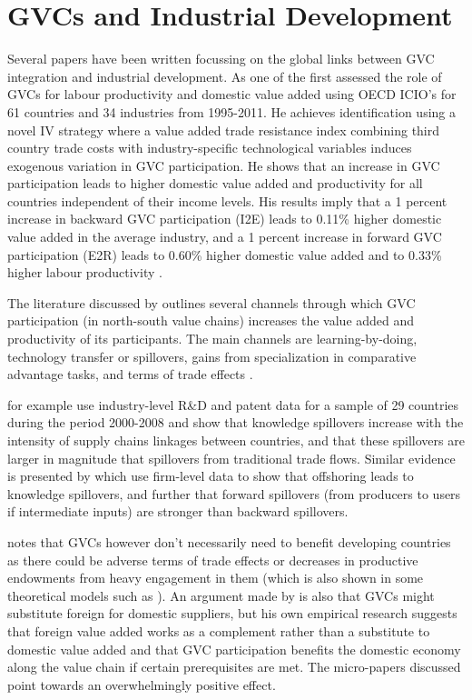 \documentclass[a4paper]{article}
\begin{document}
\section{GVCs and Industrial Development}
Several papers have been written focussing on the global links between GVC integration and industrial development. As one of the first \citet{Kummritz20161} assessed the role of GVCs for labour productivity and domestic value added using OECD ICIO's for 61 countries and 34 industries from 1995-2011. He achieves identification using a novel IV strategy where a value added trade resistance index combining third country trade costs with industry-specific technological variables induces exogenous variation in GVC participation. He shows that an increase in GVC participation leads to higher domestic value added and productivity for all countries independent of their income levels. His results imply that a 1 percent increase in backward GVC participation (I2E) leads to 0.11\% higher domestic value added in the average industry, and  a 1 percent increase in forward GVC participation (E2R) leads to 0.60\% higher domestic value added and to 0.33\% higher labour productivity \citep{Kummritz20161}. \newline


The literature discussed by \citet{Kummritz20161} outlines several channels through which GVC participation (in north-south value chains) increases the value added and productivity of its participants. The main channels are learning-by-doing, technology transfer or spillovers, gains from specialization in comparative advantage tasks, and terms of trade effects  \citep{Kummritz20161}. \newline

\citet{piermartini2014knowledge} for example use industry-level R\&D and patent data for a sample of 29 countries during the period 2000-2008 and show that knowledge spillovers increase with the intensity of supply chains linkages between countries, and that these spillovers are larger in magnitude that spillovers from traditional trade flows. Similar evidence is presented by \citet{benz2015trade} which use firm-level data to show that offshoring leads to knowledge spillovers, and further that forward spillovers (from producers to users if intermediate inputs) are stronger than backward spillovers. \newline

\citet{Kummritz20161} notes that GVCs however don't necessarily need to benefit developing countries as there could be adverse terms of trade effects or decreases in productive endowments from heavy engagement in them (which is also shown in some theoretical models such as \citet{baldwin2014trade}). An argument made by \citet{kummritz2015global} is also that GVCs might substitute foreign for domestic suppliers, but his own empirical research suggests that 
foreign value added works as a complement rather than a substitute to domestic value added and that GVC participation benefits the domestic economy along the value chain if certain prerequisites are met. The micro-papers discussed point towards an overwhelmingly positive effect. \newline
\end{document}
